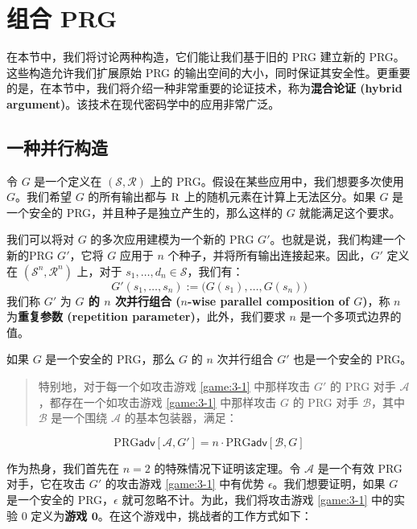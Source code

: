 \section{组合 PRG}

在本节中，我们将讨论两种构造，它们能让我们基于旧的 PRG 建立新的 PRG。这些构造允许我们扩展原始 PRG 的输出空间的大小，同时保证其安全性。更重要的是，在本节中，我们将介绍一种非常重要的论证技术，称为\textbf{混合论证 (hybrid argument)}。该技术在现代密码学中的应用非常广泛。

\subsection{一种并行构造}\label{subsec:3-4-1}

令 $G$ 是一个定义在 $(\mathcal S,\mathcal R)$ 上的 PRG。假设在某些应用中，我们想要多次使用 $G$。我们希望 $G$ 的所有输出都与 $\mathcal{\rm R}$ 上的随机元素在计算上无法区分。如果 $G$ 是一个安全的 PRG，并且种子是独立产生的，那么这样的 $G$ 就能满足这个要求。

我们可以将对 $G$ 的多次应用建模为一个新的 PRG $G'$。也就是说，我们构建一个新的PRG $G'$，它将 $G$ 应用于 $n$ 个种子，并将所有输出连接起来。因此，$G'$ 定义在 $(\mathcal S^n,\mathcal R^n)$ 上，对于 $s_1,\dots,d_n\in\mathcal S$，我们有：
\[
G'(s_1,\dots,s_n):=\big(G(s_1),\dots,G(s_n)\big)
\]
我们称 $G'$ 为 \textbf{$G$ 的 $n$ 次并行组合 ($n$-wise parallel composition of $G$)}，称 $n$ 为\textbf{重复参数 (repetition parameter)}，此外，我们要求 $n$ 是一个多项式边界的值。

\begin{theorem}\label{theo:3-2}
如果 $G$ 是一个安全的 PRG，那么 $G$ 的 $n$ 次并行组合 $G'$ 也是一个安全的 PRG。
\begin{quote}
特别地，对于每一个如攻击游戏 \ref{game:3-1} 中那样攻击 $G'$ 的 PRG 对手 $\mathcal A$，都存在一个如攻击游戏 \ref{game:3-1} 中那样攻击 $G$ 的 PRG 对手 $\mathcal B$，其中 $\mathcal B$ 是一个围绕 $\mathcal A$ 的基本包装器，满足：
\end{quote}
\[
\mathrm{PRG}\mathsf{adv}[\mathcal{A},G']
=n\cdot
\mathrm{PRG}\mathsf{adv}[\mathcal{B},G]
\]
\end{theorem}

作为热身，我们首先在 $n=2$ 的特殊情况下证明该定理。令 $\mathcal A$ 是一个有效 PRG 对手，它在攻击 $G'$ 的攻击游戏 \ref{game:3-1} 中有优势 $\epsilon$。我们想要证明，如果 $G$ 是一个安全的 PRG，$\epsilon$ 就可忽略不计。为此，我们将攻击游戏 \ref{game:3-1} 中的实验 $0$ 定义为\textbf{游戏 $\mathbf{0}$}。在这个游戏中，挑战者的工作方式如下：

